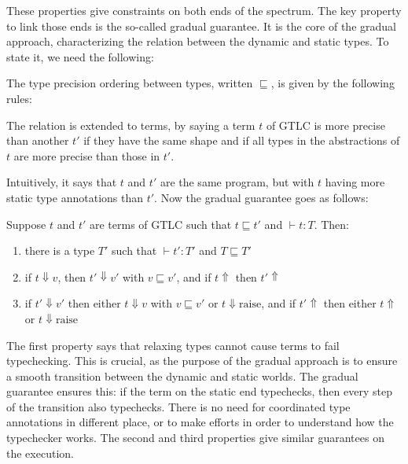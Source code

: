 \documentclass[en]{myarticle}
\renewcommand{\mathtt}{\mathrm}
\newcommand{\pre}{\sqsubseteq}
\DeclareMathOperator{\?}{?}
\newcommand{\bool}{\mathbf{B}}
\newcommand{\nat}{\mathbf{N}}
\newcommand{\rai}{\mathtt{raise}}
\begin{document}
{These properties give constraints on both ends of the spectrum. The key property to link those ends is the so-called gradual guarantee. It is the core of the gradual approach, characterizing the relation between the dynamic and static types. To state it, we need the following:

\begin{df}
	The type precision ordering between types, written $\pre$, is given by the following rules:
	
	The relation is extended to terms, by saying a term $t$ of GTLC is more precise than another $t'$ if they have the same shape and if all types in the abstractions of $t$ are more precise than those in $t'$.
\end{df}

Intuitively, it says that $t$ and $t'$ are the same program, but with $t$ having more static type annotations than $t'$. Now the gradual guarantee goes as follows:

\begin{prop}
	Suppose $t$ and $t'$ are terms of GTLC such that $t \pre t'$ and $\vdash t : T$. Then:
	\begin{enumerate}
		\item there is a type $T'$ such that $\vdash t' : T'$ and $T \pre T'$
		\item if $t \Downarrow v$, then $t' \Downarrow v'$ with $v \pre v'$, and if $t \Uparrow$ then $t' \Uparrow$
		\item if $t' \Downarrow v'$ then either $t \Downarrow v$ with $v \pre v'$ or $t \Downarrow \rai$, and if $t' \Uparrow$ then either $t \Uparrow$ or $t \Downarrow \rai$
	\end{enumerate}
\end{prop}

The first property says that relaxing types cannot cause terms to fail typechecking. This is crucial, as the purpose of the gradual approach is to ensure a smooth transition between the dynamic and static worlds. The gradual guarantee ensures this: if the term on the static end typechecks, then every step of the transition also typechecks. There is no need for coordinated type annotations in different place, or to make efforts in order to understand how the typechecker works.
The second and third properties give similar guarantees on the execution.

}
\end{document}

